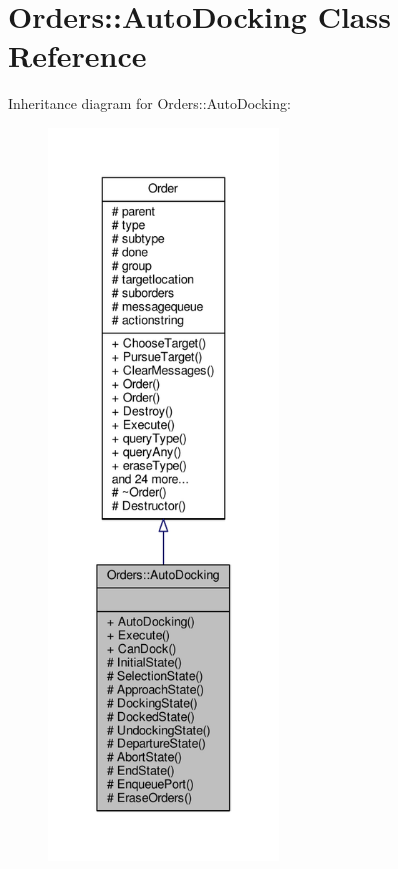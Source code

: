 \hypertarget{classOrders_1_1AutoDocking}{}\section{Orders\+:\+:Auto\+Docking Class Reference}
\label{classOrders_1_1AutoDocking}


Inheritance diagram for Orders\+:\+:Auto\+Docking\+:
\nopagebreak
\begin{figure}[H]
\begin{center}
\leavevmode
\includegraphics[height=550pt]{d8/db4/classOrders_1_1AutoDocking__inherit__graph}
\end{center}
\end{figure}


